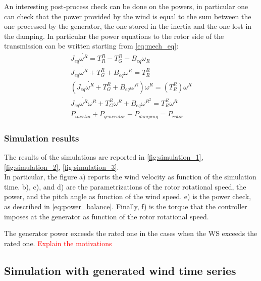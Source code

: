 An interesting post-process check can be done on the powers, in particular one can check that the power provided by the wind is equal to the sum between the one processed by the generator, the one stored in the inertia and the one lost in the damping. In particular the power equations to the rotor side of the transmission can be written starting from \ref{eq:mech_eq}:
\begin{gather}
    J_{eq}\dot{\omega^{R}} = T_R^R - T_G^R-B_{eq}\omega_R\\
    J_{eq}\dot{\omega^{R}} + T_G^R + B_{eq}\omega^R = T_R^R\\
    \left(J_{eq}\dot{\omega^{R}} + T_G^R + B_{eq}\omega^R\right)\omega^R = \left(T_R^R\right)\omega^R\\
    J_{eq}\dot{\omega^{R}}\omega^{R} + T_G^{R}\omega^{R} + B_{eq}\omega^{R^{2}} = T_R^{R}\omega^{R}\\
    P_{inertia} + P_{generator} + P_{damping} = P_{rotor} 
    \label{eq:power_balance}
\end{gather}

\subsubsection{Simulation results}
The results of the simulations are reported in \autoref{fig:simulation_1}, \ref{fig:simulation_2}, \ref{fig:simulation_3}. \\
In particular, the figure a) reports the wind velocity as function of the simulation time. b), c), and d) are the parametrizations of the rotor rotational speed, the power, and the pitch angle as function of the wind speed. e) is the power check, as described in \autoref{eq:power_balance}. Finally, f) is the torque that the controller imposes at the generator as function of the rotor rotational speed. 


The generator power exceeds the rated one in the cases when the \acrshort{WS} exceeds the rated one. \textcolor{red}{Explain the motivations}\\

\subsection{Simulation with generated wind time series}\label{sec:wind_series_sim}
